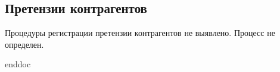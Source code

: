 \subsection{Претензии контрагентов}
\label{BP_CLaim} 

Процедуры регистрации претензии контрагентов не выявлено. 
Процесс не определен.


\clearpage
 {enddoc}